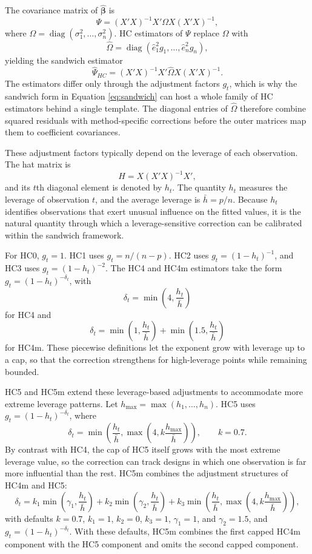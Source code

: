The covariance matrix of \(\hat{\boldsymbol{\beta}}\) is
\[
\Psi = (X'X)^{-1}X'\Omega X(X'X)^{-1},
\]
where \(\Omega = \operatorname{diag}(\sigma_1^2,\ldots,\sigma_n^2)\). HC estimators of \(\Psi\) replace \(\Omega\) with
\[
\widehat{\Omega} = \operatorname{diag}(\hat{e}_1^2 g_1,\ldots,\hat{e}_n^2 g_n),
\]
yielding the sandwich estimator
\begin{equation}
\widehat{\Psi}_{HC} = (X'X)^{-1}X'\widehat\Omega X(X'X)^{-1}.
\label{eq:sandwich}
\end{equation}
The estimators differ only through the adjustment factors \(g_t\), which is why the sandwich form in Equation \eqref{eq:sandwich} can host a whole family of HC estimators behind a single template.
The diagonal entries of \(\widehat{\Omega}\) therefore combine squared residuals with method-specific corrections before the outer matrices map them to coefficient covariances.

These adjustment factors typically depend on the leverage of each observation. The hat matrix is
\[
H = X(X'X)^{-1}X',
\]
and its \(t\)th diagonal element is denoted by \(h_t\). The quantity \(h_t\) measures the leverage of observation \(t\), and the average leverage is \(\bar{h} = p/n\). Because \(h_t\) identifies observations that exert unusual influence on the fitted values, it is the natural quantity through which a leverage-sensitive correction can be calibrated within the sandwich framework.

For HC0, \(g_t = 1\). HC1 uses \(g_t = n/(n-p)\). HC2 uses \(g_t = (1-h_t)^{-1}\), and HC3 uses \(g_t = (1-h_t)^{-2}\). The HC4 and HC4m estimators take the form \(g_t=(1-h_t)^{-\delta_t}\), with
\[
\delta_t = \min\left(4, \frac{h_t}{\bar{h}}\right)
\]
for HC4 and
\[
\delta_t = \min\left(1, \frac{h_t}{\bar{h}}\right)
+ \min\left(1.5, \frac{h_t}{\bar{h}}\right)
\]
for HC4m. These piecewise definitions let the exponent grow with leverage up to a cap, so that the correction strengthens for high-leverage points while remaining bounded.

HC5 and HC5m extend these leverage-based adjustments to accommodate more extreme leverage patterns. Let \(h_{\max} = \max(h_1,\ldots,h_n)\). HC5 uses \(g_t=(1-h_t)^{-\delta_t}\), where
\[
\delta_t = \min\left(
\frac{h_t}{\bar{h}},
\max\left(4, k\frac{h_{\max}}{\bar{h}}\right)
\right),
\qquad k = 0.7.
\]
By contrast with HC4, the cap of HC5 itself grows with the most extreme leverage value, so the correction can track designs in which one observation is far more influential than the rest. HC5m combines the adjustment structures of HC4m and HC5:
\[
\delta_t
=
k_1\min\left(\gamma_1, \frac{h_t}{\bar{h}}\right)
+
k_2\min\left(\gamma_2, \frac{h_t}{\bar{h}}\right)
+
k_3\min\left(
\frac{h_t}{\bar{h}},
\max\left(4, k\frac{h_{\max}}{\bar{h}}\right)
\right),
\]
with defaults \(k=0.7\), \(k_1=1\), \(k_2=0\), \(k_3=1\), \(\gamma_1=1\), and \(\gamma_2=1.5\), and \(g_t=(1-h_t)^{-\delta_t}\). With these defaults, HC5m combines the first capped HC4m component with the HC5 component and omits the second capped component.

